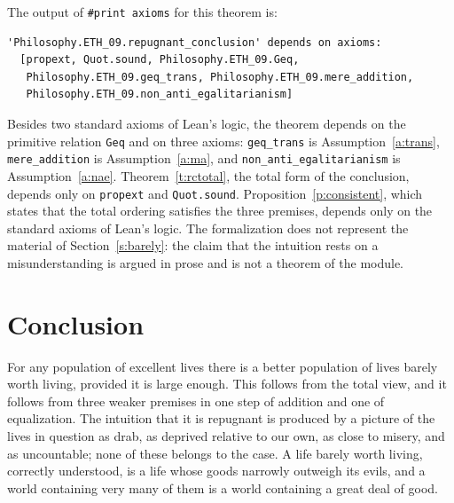 \documentclass{situationist-preprint}
\begin{document}
The output of \texttt{\#print axioms} for this theorem is:

\begin{lstlisting}
'Philosophy.ETH_09.repugnant_conclusion' depends on axioms:
  [propext, Quot.sound, Philosophy.ETH_09.Geq,
   Philosophy.ETH_09.geq_trans, Philosophy.ETH_09.mere_addition,
   Philosophy.ETH_09.non_anti_egalitarianism]
\end{lstlisting}

Besides two standard axioms of Lean's logic, the theorem depends on the primitive relation \texttt{Geq} and on three axioms: \texttt{geq\_trans} is Assumption~\ref{a:trans}, \texttt{mere\_addition} is Assumption~\ref{a:ma}, and \texttt{non\_anti\_egalitarianism} is Assumption~\ref{a:nae}. Theorem~\ref{t:rctotal}, the total form of the conclusion, depends only on \texttt{propext} and \texttt{Quot.sound}. Proposition~\ref{p:consistent}, which states that the total ordering satisfies the three premises, depends only on the standard axioms of Lean's logic. The formalization does not represent the material of Section~\ref{s:barely}: the claim that the intuition rests on a misunderstanding is argued in prose and is not a theorem of the module.

\section{Conclusion}

For any population of excellent lives there is a better population of lives barely worth living, provided it is large enough. This follows from the total view, and it follows from three weaker premises in one step of addition and one of equalization. The intuition that it is repugnant is produced by a picture of the lives in question as drab, as deprived relative to our own, as close to misery, and as uncountable; none of these belongs to the case. A life barely worth living, correctly understood, is a life whose goods narrowly outweigh its evils, and a world containing very many of them is a world containing a great deal of good.
\end{document}

